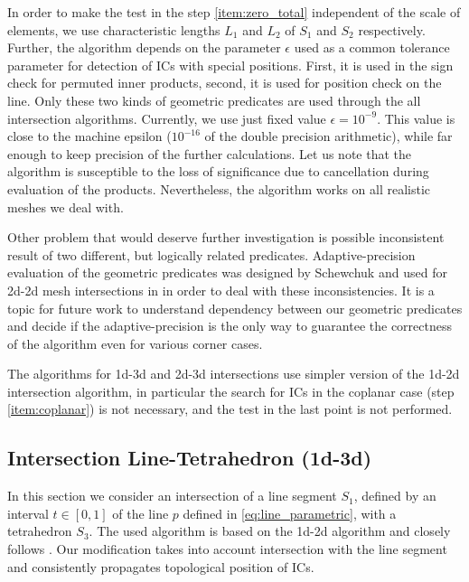 In order to make the test in the step \ref{item:zero_total} independent of the  scale of elements, we use characteristic lengths $L_1$ and $L_2$ of $S_1$ and $S_2$ respectively.
Further, the algorithm depends on the parameter $\epsilon$ used as a common tolerance parameter for detection of ICs with special positions. First, it is used 
in the sign check for permuted inner products, second, it is used for position check on the line. Only these two kinds of geometric predicates are used 
through the all intersection algorithms. Currently, we use just fixed value $\epsilon=10^{-9}$. This value is close to the machine epsilon ($10^{-16}$ 
of the double precision 
arithmetic), while far enough to keep precision of the further calculations. Let us note that the algorithm is susceptible to the loss of significance 
due to cancellation during evaluation of the products. Nevertheless, the algorithm works on all realistic meshes we deal with.

Other problem that would deserve further investigation is possible inconsistent result of two different, but logically related predicates. 
Adaptive-precision evaluation of 
the geometric predicates was designed by Schewchuk \cite{shewchuk_adaptive_1997} and used for 2d-2d mesh intersections in \cite{elsheikh_reliable_2012}
in order to deal with these inconsistencies. It is a topic for future work to understand dependency between our geometric predicates
and decide if the adaptive-precision is the only way to guarantee the correctness of the algorithm even for various corner cases.


The algorithms for 1d-3d and 2d-3d intersections use simpler version of the 1d-2d intersection algorithm, in particular the search for ICs in the coplanar case 
(step \ref{item:coplanar}) is not necessary, and the test in the last point is not performed.


\subsection{Intersection Line-Tetrahedron (1d-3d)}
In this section we consider an intersection of a line segment $S_1$, defined by an interval $t\in [0,1]$ of the line $p$ defined in \eqref{eq:line_parametric}, with a tetrahedron 
$S_3$. The used algorithm is based on the 1d-2d algorithm and closely follows \cite{platis_fast_2003}. Our modification takes into account
intersection with the line segment and consistently propagates topological position of ICs.


